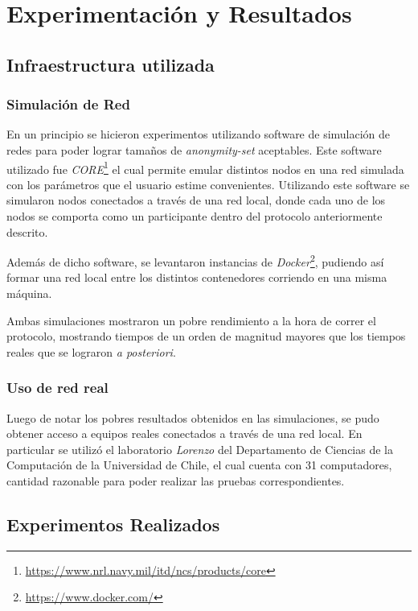 \chapter{Experimentación y Resultados}
\section{Infraestructura utilizada}

\subsection{Simulación de Red}

En un principio se hicieron experimentos utilizando software 
de simulación de redes para poder lograr tamaños de 
\emph{anonymity-set} aceptables. Este software utilizado fue 
\emph{CORE}\footnote{\url{https://www.nrl.navy.mil/itd/ncs/products/core}} 
el cual permite emular distintos nodos en una red simulada 
con los parámetros que el usuario estime convenientes. Utilizando 
este software se simularon nodos conectados a través de una red local, 
donde cada uno de los nodos se comporta como un participante dentro 
del protocolo anteriormente descrito.

Además de dicho software, se levantaron instancias de 
\emph{Docker}\footnote{\url{https://www.docker.com/}}, pudiendo así 
formar una red local entre los distintos contenedores corriendo 
en una misma máquina.

Ambas simulaciones mostraron un pobre rendimiento a la hora de 
correr el protocolo, mostrando tiempos de un orden de magnitud 
mayores que los tiempos reales que se lograron \emph{a posteriori}.

\subsection{Uso de red real}

Luego de notar los pobres resultados obtenidos en las simulaciones, se 
pudo obtener acceso a equipos reales conectados a través de una red 
local. En particular se utilizó el laboratorio \emph{Lorenzo} del 
Departamento de Ciencias de la Computación de la Universidad de Chile, el 
cual cuenta con 31 computadores, cantidad razonable para poder realizar 
las pruebas correspondientes.

\section{Experimentos Realizados}

